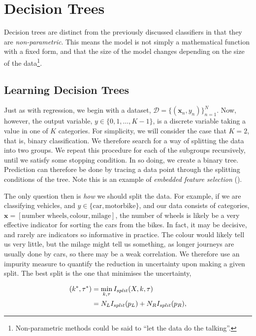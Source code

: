 \documentclass[11pt]{amsart}
\begin{document}
\section{Decision Trees}

Decision trees are distinct from the previously discussed classifiers in that they are \emph{non-parametric}. This means the model is not simply a mathematical function with a fixed form, and that the size of the model changes depending on the size of the data\footnote{Non-parametric methods could be said to ``let the data do the talking''.}.

\subsection{Learning Decision Trees}

Just as with regression, we begin with a dataset, $\mathcal{D} = \{(\mathbf{x}_n, y_n)\}_{n=1}^{N}$. Now, however, the output variable, $y \in \{0, 1, \dots, K-1\}$, is a discrete variable taking a value in one of $K$ categories. For simplicity, we will consider the case that $K = 2$, that is, binary classification. We therefore search for a way of splitting the data into two groups. We repeat this procedure for each of the subgroups recursively, until we satisfy some stopping condition. In so doing, we create a binary tree. Prediction can therefore be done by tracing a data point through the splitting conditions of the tree. Note this is an example of \emph{embedded feature selection} (\cite{featureselectionsurvey}).

The only question then is \emph{how} we should split the data. For example, if we are classifying vehicles, and $y \in \{\text{car}, \text{motorbike}\}$, and our data consists of categories, $\mathbf{x} = [\text{number wheels}, \text{colour}, \text{milage}]$, the number of wheels is likely be a very effective indicator for sorting the cars from the bikes. In fact, it may be decisive, and rarely are indicators so informative in practice. The colour would likely tell us very little, but the milage might tell us something, as longer journeys are usually done by cars, so there may be a weak correlation. We therefore use an impurity measure to quantify the reduction in uncertainty upon making a given split. The best split is the one that minimises the uncertainty,

\begin{align}
( k^*, \tau^*) &= \min_{k, \tau} I_{split}(X, k, \tau) \notag \\
&= N_LI_{split}(p_L) + N_RI_{split}(p_R), \notag
\end{align}
\end{document}

